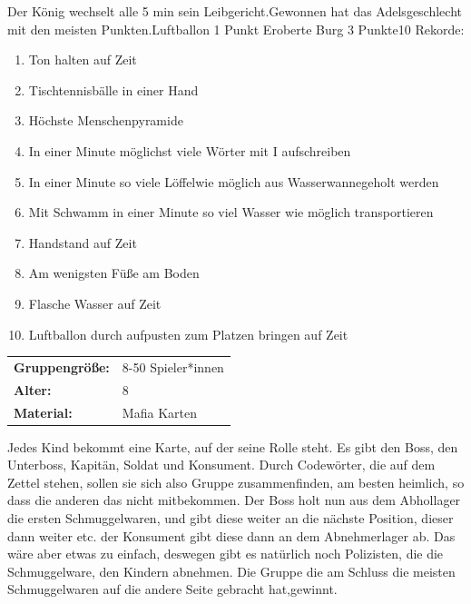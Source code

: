 Der König wechselt alle 5 min sein Leibgericht.Gewonnen hat das Adelsgeschlecht mit den meisten Punkten.Luftballon 1 Punkt Eroberte Burg 3 Punkte10 Rekorde: \\
 \begin{enumerate}
    \item  Ton halten auf Zeit
    \item Tischtennisbälle in einer Hand
    \item Höchste Menschenpyramide
    \item In einer Minute möglichst viele Wörter mit I aufschreiben
    \item  In einer Minute so viele Löffelwie möglich aus Wasserwannegeholt werden
    \item Mit Schwamm in einer Minute so viel Wasser wie möglich transportieren
    \item Handstand auf Zeit
    \item Am wenigsten Füße am Boden
    \item Flasche Wasser auf Zeit
    \item Luftballon durch aufpusten zum Platzen bringen auf Zeit
\end{enumerate}




\begin{table}[H]
\begin{tabular}{>{\bfseries}lp{8cm}}
   Gruppengröße:   & 8-50 Spieler*innen\\
    Alter: & 8 \\
    Material: & Mafia Karten \\
\end{tabular}
\end{table} 
Jedes Kind bekommt eine Karte, auf der seine Rolle steht. Es gibt den Boss, den Unterboss, Kapitän, Soldat und Konsument. Durch Codewörter, die auf dem Zettel stehen, sollen sie sich also Gruppe zusammenfinden, am besten heimlich, so dass die anderen das nicht mitbekommen. Der Boss holt nun aus dem Abhollager die ersten Schmuggelwaren, und gibt diese weiter an die nächste Position, dieser dann weiter etc. der Konsument gibt diese dann an dem Abnehmerlager ab. Das wäre aber etwas zu einfach, deswegen gibt es natürlich noch Polizisten, die die Schmuggelware, den Kindern abnehmen. Die Gruppe die am Schluss die meisten Schmuggelwaren auf die andere Seite gebracht hat,gewinnt.  \\

